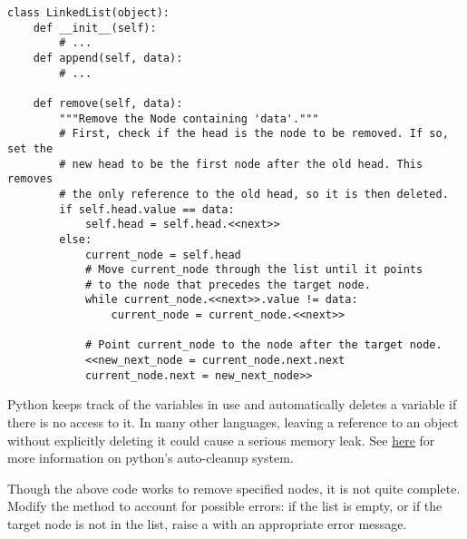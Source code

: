 \begin{lstlisting}
class LinkedList(object):
	def __init__(self):
		# ...
	def append(self, data):
		# ...

	def remove(self, data):
		"""Remove the Node containing 'data'."""
		# First, check if the head is the node to be removed. If so, set the
		# new head to be the first node after the old head. This removes
		# the only reference to the old head, so it is then deleted.
		if self.head.value == data:
			self.head = self.head.<<next>>
		else:
			current_node = self.head
			# Move current_node through the list until it points
			# to the node that precedes the target node.
			while current_node.<<next>>.value != data:
				current_node = current_node.<<next>>
	
			# Point current_node to the node after the target node.
			<<new_next_node = current_node.next.next
			current_node.next = new_next_node>>
\end{lstlisting}

\begin{warn}

Python keeps track of the variables in use and automatically deletes a variable if there is no access to it.
In many other languages, leaving a reference to an object without explicitly deleting it could cause a serious memory leak.
See \href{https://docs.python.org/2/library/gc.html}{here} for more information on python's auto-cleanup system.
\end{warn}

\begin{problem}
Though the above code works to remove specified nodes, it is not quite complete.
Modify the  method to account for possible errors: if the list is empty, or if the target node is not in the list, raise a  with an appropriate error message.
\end{problem}

